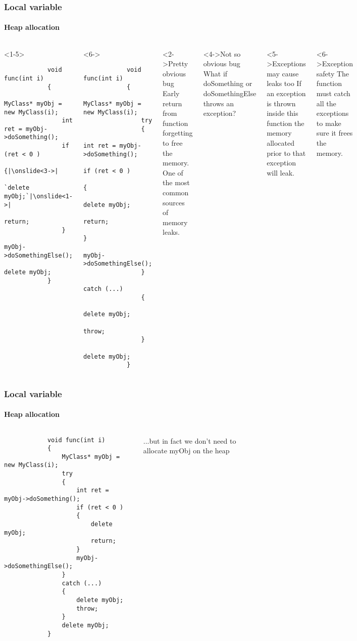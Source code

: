 \documentclass{beamer}
\begin{document}
\begin{frame}[fragile,t]
\frametitle{Local variable}
\framesubtitle{Heap allocation}
	\begin{columns}[t]
		\begin{onlyenv}
		\begin{lstlisting}
			void func(int i)
			{
				MyClass* myObj = new MyClass(i);
				int ret = myObj->doSomething();
				if (ret < 0 )
				{|\onslide<3->|
					`delete myObj;`|\onslide<1->|
					return;
				}	
				myObj->doSomethingElse();			
				delete myObj;
			}
		\end{lstlisting}
		\end{onlyenv}
		\begin{onlyenv}<6->
		\begin{lstlisting}
			void func(int i)
			{
				MyClass* myObj = new MyClass(i);
				try
				{
					int ret = myObj->doSomething();
					if (ret < 0 )
					{
						delete myObj;
						return;
					}
					myObj->doSomethingElse();			
				}
				catch (...)
				{
					delete myObj;
					throw;
				}
				delete myObj;
			}
		\end{lstlisting}
		\end{onlyenv}
		\begin{block}<2->{Pretty obvious bug}
			Early return from function forgetting to free the memory. 
			One of the most common sources of memory leaks.
		\end{block}
		\begin{block}<4->{Not so obvious bug}
			What if doSomething or doSomethingElse throws an exception?
		\end{block}
		\begin{block}<5->{Exceptions may cause leaks too}
			If an exception is thrown inside this function the memory allocated prior to that exception will leak.
		\end{block}
		\begin{block}<6->{Exception safety}
			The function must catch all the exceptions
			to make sure it frees the memory.
		\end{block}
	\end{columns}
\end{frame}

\begin{frame}[fragile]
\frametitle{Local variable}
\framesubtitle{Heap allocation}
	\begin{columns}[t]
		\begin{lstlisting}
			void func(int i)
			{
				MyClass* myObj = new MyClass(i);
				try
				{
					int ret = myObj->doSomething();
					if (ret < 0 )
					{
						delete myObj;
						return;
					}
					myObj->doSomethingElse();			
				}
				catch (...)
				{
					delete myObj;
					throw;
				}
				delete myObj;
			}
		\end{lstlisting}
		...but in fact we don't need to allocate myObj on the heap
	\end{columns}
\end{frame}
\end{document}
